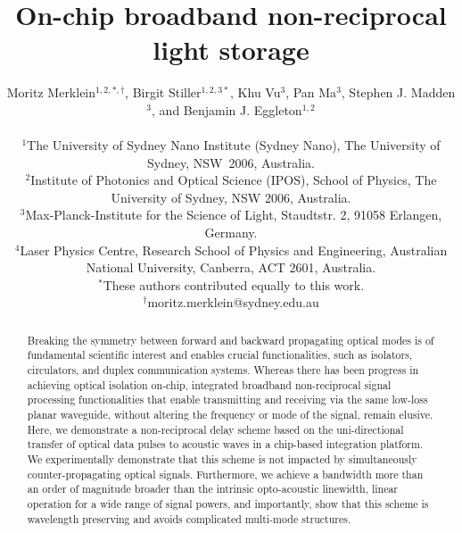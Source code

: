 \documentclass[superscriptaddress, nofootinbib, twocolumn, amsmath,amssymb, aps, pra, notitlepage, longbibliography]{revtex4-1}
\begin{document}
\title{On-chip broadband non-reciprocal light storage}

\author{Moritz Merklein$^{1,2,\ast,\dagger}$, Birgit Stiller$^{1,2,3\ast}$, Khu Vu$^{3}$,  Pan Ma$^{3}$, Stephen J. Madden$^{3}$, and Benjamin J. Eggleton$^{1,2}$\\
\small{ \textcolor{white}{blanc\\}
$^{1}$The University of Sydney Nano Institute (Sydney Nano), The University of Sydney, NSW~2006, Australia.\\
$^{2}$Institute of Photonics and Optical Science (IPOS), School of Physics, The University of Sydney, NSW 2006, Australia.\\
$^{3}$Max-Planck-Institute for the Science of Light, Staudtstr. 2, 91058 Erlangen, Germany.\\
$^{4}$Laser Physics Centre, Research School of Physics and Engineering, Australian National University, Canberra, ACT 2601, Australia.\\
$^{\ast}$These authors contributed equally to this work.\\
$^{\dagger}$moritz.merklein@sydney.edu.au}}

\begin{abstract} 

Breaking the symmetry between forward and backward propagating optical modes is of fundamental scientific interest and enables crucial functionalities, such as isolators, circulators, and duplex communication systems. Whereas there has been progress in achieving optical isolation on-chip, integrated broadband non-reciprocal signal processing functionalities that enable transmitting and receiving via the same low-loss planar waveguide, without altering the frequency or mode of the signal, remain elusive.
Here, we demonstrate a non-reciprocal delay scheme based on the uni-directional transfer of optical data pulses to acoustic waves in a chip-based integration platform. We experimentally demonstrate that this scheme is not impacted by simultaneously counter-propagating optical signals. Furthermore, we achieve a bandwidth more than an order of magnitude broader than the intrinsic opto-acoustic linewidth, linear operation for a wide range of signal powers, and importantly, show that this scheme is wavelength preserving and avoids complicated multi-mode structures.

\end{abstract}

\maketitle
\end{document}
